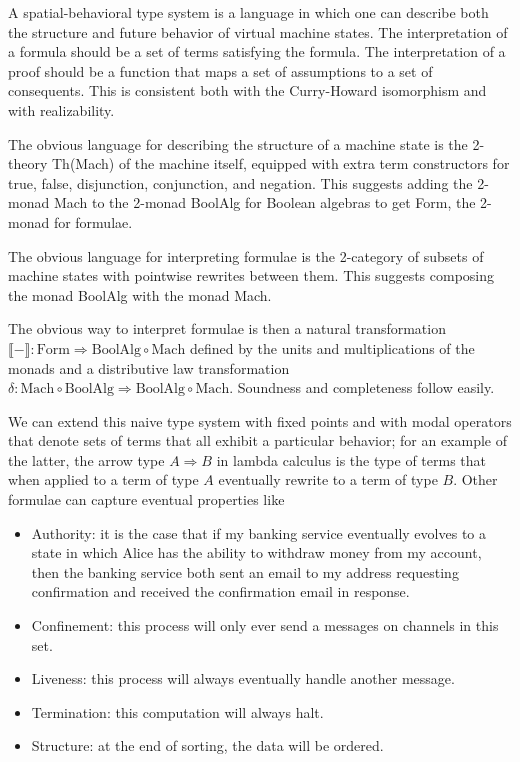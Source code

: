 \documentclass{article}
\newcommand{\interp}[1]{\llbracket #1 \rrbracket}
\newcommand{\maps}{\colon}
\newcommand{\Mach}{\mathrm{Mach}}
\newcommand{\BoolAlg}{\mathrm{BoolAlg}}
\newcommand{\Form}{\mathrm{Form}}
\begin{document}
  A spatial-behavioral type system is a language in which one can describe both the structure and future behavior of virtual machine states.  The interpretation of a formula should be a set of terms satisfying the formula.  The interpretation of a proof should be a function that maps a set of assumptions to a set of consequents.  This is consistent both with the Curry-Howard isomorphism and with realizability.

  The obvious language for describing the structure of a machine state is the 2-theory Th(Mach) of the machine itself, equipped with extra term constructors for true, false, disjunction, conjunction, and negation.  This suggests adding the 2-monad Mach to the 2-monad BoolAlg for Boolean algebras to get Form, the 2-monad for formulae.

  The obvious language for interpreting formulae is the 2-category of subsets of machine states with pointwise rewrites between them.  This suggests composing the monad BoolAlg with the monad Mach.

  The obvious way to interpret formulae is then a natural transformation $\interp{-} \maps \Form \Rightarrow \BoolAlg \circ \Mach$ defined by the units and multiplications of the monads and a distributive law transformation $\delta\maps \Mach \circ \BoolAlg \Rightarrow \BoolAlg \circ \Mach.$  Soundness and completeness follow easily.

  We can extend this naive type system with fixed points and with modal operators that denote sets of terms that all exhibit a particular behavior; for an example of the latter, the arrow type $A \Rightarrow B$ in lambda calculus is the type of terms that when applied to a term of type $A$ eventually rewrite to a term of type $B$.  Other formulae can capture eventual properties like
\begin{itemize}
  \item Authority: it is the case that if my banking service eventually evolves to a state in which Alice has the ability to withdraw money from my account, then the banking service both sent an email to my address requesting confirmation and received the confirmation email in response.
  \item Confinement: this process will only ever send a messages on channels in this set.
  \item Liveness: this process will always eventually handle another message.
  \item Termination: this computation will always halt.
  \item Structure: at the end of sorting, the data will be ordered.
\end{itemize}
\end{document}
